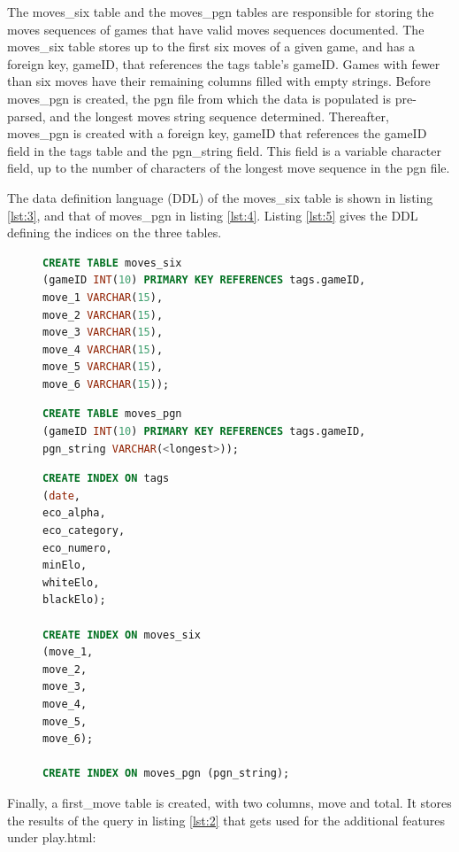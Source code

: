 \documentclass{article}
\begin{document}
The moves\_six table and the moves\_pgn tables are responsible for storing
the moves sequences of games that have valid moves sequences documented.
The moves\_six table stores up to the first six moves of a given game, and
has a foreign key, gameID, that references the tags table's gameID.  Games
with fewer than six moves have their remaining columns filled with empty
strings. Before moves\_pgn is created, the pgn file from which the data
is populated is pre-parsed, and the longest moves string sequence determined.
Thereafter, moves\_pgn is created with a foreign key, gameID that
references the gameID field in the tags table and the pgn\_string field.
This field is a variable character field, up to the number of characters of
the longest move sequence in the pgn file.

The data definition language (DDL) of the moves\_six table is shown in listing
\ref{lst:3}, and that of moves\_pgn in listing \ref{lst:4}. Listing
\ref{lst:5} gives the DDL defining the indices on the three tables.

\begin{figure}[h]
	\begin{lstlisting}[label={lst:3}, language=sql, frame=single,
	caption=DDL describing the structure of the moves\_six table]
CREATE TABLE moves_six
(gameID INT(10) PRIMARY KEY REFERENCES tags.gameID,
move_1 VARCHAR(15),
move_2 VARCHAR(15),
move_3 VARCHAR(15),
move_4 VARCHAR(15),
move_5 VARCHAR(15),
move_6 VARCHAR(15));
	\end{lstlisting}
\end{figure}

\begin{figure}[h]
	\begin{lstlisting}[label={lst:4}, language=sql, frame=single,
	caption=DDL describing the structure of the moves\_pgn table]
CREATE TABLE moves_pgn
(gameID INT(10) PRIMARY KEY REFERENCES tags.gameID,
pgn_string VARCHAR(<longest>));
	\end{lstlisting}
\end{figure}

\begin{figure}[h]
	\begin{lstlisting}[label={lst:5}, language=sql, frame=single,
	caption=DDL describing the structure of the various indices]
CREATE INDEX ON tags
(date,
eco_alpha,
eco_category,
eco_numero,
minElo,
whiteElo,
blackElo);

CREATE INDEX ON moves_six
(move_1,
move_2,
move_3,
move_4,
move_5,
move_6);

CREATE INDEX ON moves_pgn (pgn_string);
	\end{lstlisting}
\end{figure}
Finally, a first\_move table is created, with two columns, move and total.
It stores the results of the query in listing \ref{lst:2} that gets used for the
additional features under play.html:
\end{document}

